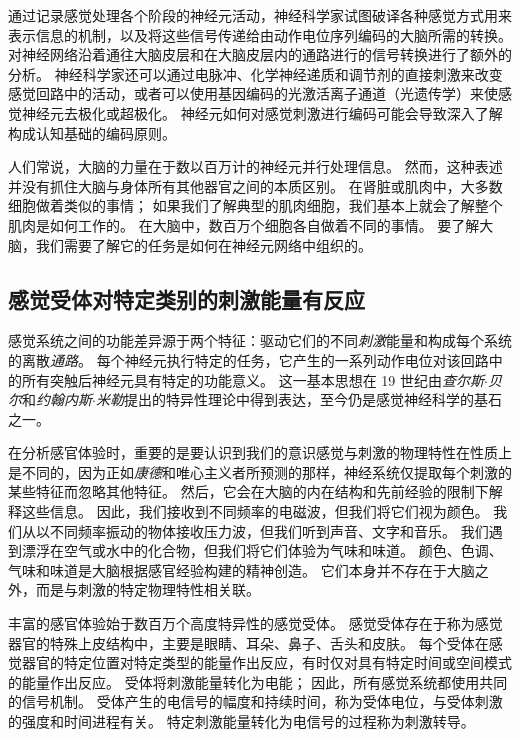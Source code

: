 通过记录感觉处理各个阶段的神经元活动，神经科学家试图破译各种感觉方式用来表示信息的机制，以及将这些信号传递给由动作电位序列编码的大脑所需的转换。 
对神经网络沿着通往大脑皮层和在大脑皮层内的通路进行的信号转换进行了额外的分析。 
神经科学家还可以通过电脉冲、化学神经递质和调节剂的直接刺激来改变感觉回路中的活动，或者可以使用基因编码的光激活离子通道（光遗传学）来使感觉神经元去极化或超极化。 
神经元如何对感觉刺激进行编码可能会导致深入了解构成认知基础的编码原则。


人们常说，大脑的力量在于数以百万计的神经元并行处理信息。 
然而，这种表述并没有抓住大脑与身体所有其他器官之间的本质区别。 
在肾脏或肌肉中，大多数细胞做着类似的事情； 
如果我们了解典型的肌肉细胞，我们基本上就会了解整个肌肉是如何工作的。 
在大脑中，数百万个细胞各自做着不同的事情。 
要了解大脑，我们需要了解它的任务是如何在神经元网络中组织的。



\subsection{感觉受体对特定类别的刺激能量有反应}

感觉系统之间的功能差异源于两个特征：驱动它们的不同\textit{刺激}能量和构成每个系统的离散\textit{通路}。 
每个神经元执行特定的任务，它产生的一系列动作电位对该回路中的所有突触后神经元具有特定的功能意义。 
这一基本思想在 19 世纪由\textit{查尔斯$\cdot$贝尔}和\textit{约翰内斯$\cdot$米勒}提出的特异性理论中得到表达，至今仍是感觉神经科学的基石之一。


在分析感官体验时，重要的是要认识到我们的意识感觉与刺激的物理特性在性质上是不同的，因为正如\textit{康德}和唯心主义者所预测的那样，神经系统仅提取每个刺激的某些特征而忽略其他特征。 
然后，它会在大脑的内在结构和先前经验的限制下解释这些信息。 
因此，我们接收到不同频率的电磁波，但我们将它们视为颜色。 
我们从以不同频率振动的物体接收压力波，但我们听到声音、文字和音乐。 
我们遇到漂浮在空气或水中的化合物，但我们将它们体验为气味和味道。 
颜色、色调、气味和味道是大脑根据感官经验构建的精神创造。 
它们本身并不存在于大脑之外，而是与刺激的特定物理特性相关联。


丰富的感官体验始于数百万个高度特异性的感觉受体。 
感觉受体存在于称为感觉器官的特殊上皮结构中，主要是眼睛、耳朵、鼻子、舌头和皮肤。 
每个受体在感觉器官的特定位置对特定类型的能量作出反应，有时仅对具有特定时间或空间模式的能量作出反应。 
受体将刺激能量转化为电能； 
因此，所有感觉系统都使用共同的信号机制。 
受体产生的电信号的幅度和持续时间，称为受体电位，与受体刺激的强度和时间进程有关。
特定刺激能量转化为电信号的过程称为刺激转导。


